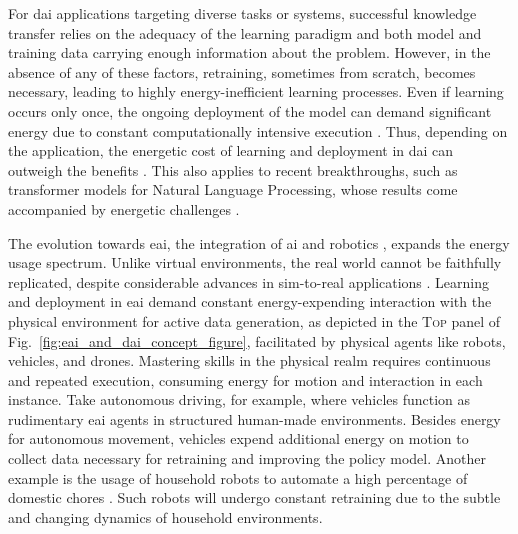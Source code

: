 \documentclass[12pt]{article}
\begin{document}
For \ac{dai} applications targeting diverse tasks or systems, successful knowledge transfer relies on the adequacy of the learning paradigm and both model and training data carrying enough information about the problem. However, in the absence of any of these factors, retraining, sometimes from scratch, becomes necessary, leading to highly energy-inefficient learning processes. Even if learning occurs only once, the ongoing deployment of the model can demand significant energy due to constant computationally intensive execution \cite{Vries2023growingenergyfootprint}. Thus, depending on the application, the energetic cost of learning and deployment in \ac{dai} can outweigh the benefits \cite{Strubell2019EnergyPolicyConsiderations}. This also applies to recent breakthroughs, such as transformer models for Natural Language Processing, whose results come accompanied by energetic challenges \cite{Cao2020TowardsAccurateReliable}.

The evolution towards \ac{eai}, the integration of \ac{ai} and robotics \cite{Pfeifer2004Embodiedartificialintelligence}, expands the energy usage spectrum. Unlike virtual environments, the real world cannot be faithfully replicated, despite considerable advances in sim-to-real applications \cite{Chebotar2019Closingsimreal}. Learning and deployment in \ac{eai} demand constant energy-expending interaction with the physical environment for active data generation, as depicted in the \textsc{Top} panel of Fig.~\ref{fig:eai_and_dai_concept_figure}, facilitated by physical agents like robots, vehicles, and drones. Mastering skills in the physical realm requires continuous and repeated execution, consuming energy for motion and interaction in each instance. Take autonomous driving, for example, where vehicles function as rudimentary \ac{eai} agents in structured human-made environments. Besides energy for autonomous movement, vehicles expend additional energy on motion to collect data necessary for retraining and improving the policy model. Another example is the usage of household robots to automate a high percentage of domestic chores \cite{Lehdonvirta2022futuresunpaidwork}. Such robots will undergo constant retraining due to the subtle and changing dynamics of household environments.
\end{document}
